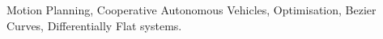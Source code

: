 \noindent Motion Planning, Cooperative Autonomous Vehicles, Optimisation, Bezier Curves, Differentially Flat systems.
